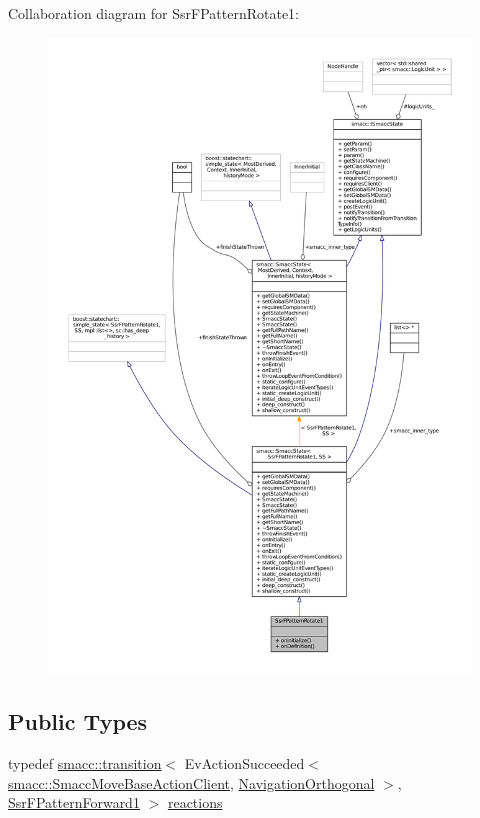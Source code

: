 Collaboration diagram for Ssr\+F\+Pattern\+Rotate1\+:
\nopagebreak
\begin{figure}[H]
\begin{center}
\leavevmode
\includegraphics[width=350pt]{structSsrFPatternRotate1__coll__graph}
\end{center}
\end{figure}
\subsection*{Public Types}
\begin{DoxyCompactItemize}
\item 
typedef \hyperlink{classsmacc_1_1transition}{smacc\+::transition}$<$ Ev\+Action\+Succeeded$<$ \hyperlink{classsmacc_1_1SmaccMoveBaseActionClient}{smacc\+::\+Smacc\+Move\+Base\+Action\+Client}, \hyperlink{classNavigationOrthogonal}{Navigation\+Orthogonal} $>$, \hyperlink{structSsrFPatternForward1}{Ssr\+F\+Pattern\+Forward1} $>$ \hyperlink{structSsrFPatternRotate1_a13565ec233d28127e8e5f3690390e6ec}{reactions}
\end{DoxyCompactItemize}

